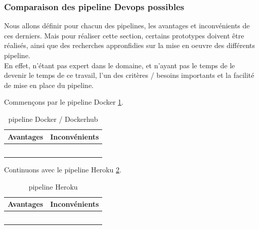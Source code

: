 \documentclass[
    iai, %
    il, %
]{heig-tb}
\begin{document}
\subsubsection{Comparaison des pipeline Devops possibles}
Nous allons définir pour chacun des pipelines, les avantages et inconvénients de ces derniers.
Mais pour réaliser cette section, certains prototypes doivent être réalisés, ainsi que des recherches appronfidies sur la mise en oeuvre des différents pipeline.\\
En effet, n'étant pas expert dans le domaine, et n'ayant pas le temps de le devenir le temps de ce travail, l'un des critères / besoins importants et la facilité de mise en place du pipeline.

Commençons par le pipeline Docker \ref{devops-dockerhub}.
\begin{table}[h]
    \begin{center}
        \caption{pipeline Docker / Dockerhub \label{devops-dockerhub}}
        \begin{tabularx}{1.0\textwidth} {X|X}
            Avantages & Inconvénients \\ \hline
                      &               \\
                      &               \\
                      &               \\
                      &               \\
                      &               \\
        \end{tabularx}
    \end{center}
\end{table}

Continuons avec le pipeline Heroku \ref{devops-heroku}.
\begin{table}[h]
    \begin{center}
        \caption{pipeline Heroku \label{devops-heroku}}
        \begin{tabularx}{1.0\textwidth} {X|X}
            Avantages & Inconvénients \\ \hline
                      &               \\
                      &               \\
                      &               \\
                      &               \\
                      &               \\
        \end{tabularx}
    \end{center}
\end{table}
\end{document}
